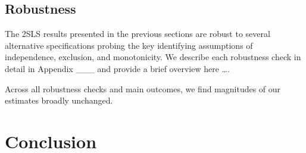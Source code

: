 \documentclass[,,nonblindrev]{informs}
\begin{document}
\hypertarget{robustness}{%
\subsection{Robustness}\label{robustness}}

The 2SLS results presented in the previous sections are robust to
several alternative specifications probing the key identifying
assumptions of independence, exclusion, and monotonicity. We describe
each robustness check in detail in Appendix \_\_\_ and provide a brief
overview here \ldots.

Across all robustness checks and main outcomes, we find magnitudes of
our estimates broadly unchanged.

\hypertarget{conclusion}{%
\section{Conclusion}\label{conclusion}}

\clearpage
\end{document}
